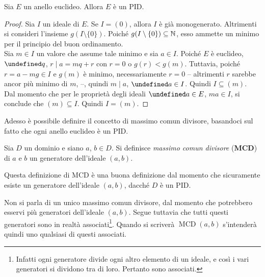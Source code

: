 \documentclass[a4paper]{article}
\DeclareMathOperator{\MCD}{MCD}
\let\oldforall\forall
\let\forall\undefined
\DeclareMathOperator{\forall}{\oldforall}
\let\oldexists\exists
\let\exists\undefined
\DeclareMathOperator{\exists}{\oldexists}
\begin{document}
\begin{theorem}
    Sia $E$ un anello euclideo. Allora $E$ è un PID.
\end{theorem}

\begin{proof}
    Sia $I$ un ideale di $E$. Se $I = (0)$, allora $I$ è già monogenerato.
    Altrimenti si consideri l'insieme $g(I \setminus \{0\})$. Poiché
    $g(I \setminus \{0\}) \subseteq \mathbb{N}$,
    esso ammette un minimo per il principio del buon ordinamento. \\

    Sia $m \in I$ un valore che assume tale minimo e sia $a \in I$.
    Poiché $E$ è euclideo, $\exists q$, $r \mid a = mq + r$ con $r=0$ o
    $g(r)<g(m)$. Tuttavia, poiché $r = a-mg \in I$ e $g(m)$ è minimo, necessariamente $r=0$ -- altrimenti $r$ sarebbe
    ancor più minimo di $m$, \Lightning{} --,
    quindi $m \mid a$, $\forall a \in I$. Quindi $I \subseteq (m)$. \\

    Dal momento che per le proprietà degli ideali $\forall a \in E$, $ma \in I$,
    si conclude che $(m) \subseteq I$. Quindi $I = (m)$.
\end{proof}

Adesso è possibile definire il concetto di massimo comun divisore, basandoci
sul fatto che ogni anello euclideo è un PID.

\begin{definition}
    Sia $D$ un dominio e siano $a$, $b \in D$. Si definisce
    \textit{massimo comun divisore} (\textbf{MCD}) di $a$ e $b$ un
    generatore dell'ideale $(a,b)$.
\end{definition}

\begin{note}
    Questa definizione di MCD è una buona definizione dal momento che sicuramente
    esiste un generatore dell'ideale $(a,b)$, dacché $D$ è un PID.
\end{note}

\begin{note}
    Non si parla di un unico massimo comun divisore, dal momento che
    potrebbero esservi più generatori dell'ideale $(a,b)$. Segue tuttavia che tutti questi generatori sono in realtà
    associati\footnote{Infatti ogni generatore divide ogni
        altro elemento di un ideale, e così i vari generatori si
        dividono tra di loro. Pertanto sono associati.}.
    Quando si scriverà
    $\MCD(a,b)$ s'intenderà quindi uno qualsiasi di questi associati.
\end{note}
\end{document}
